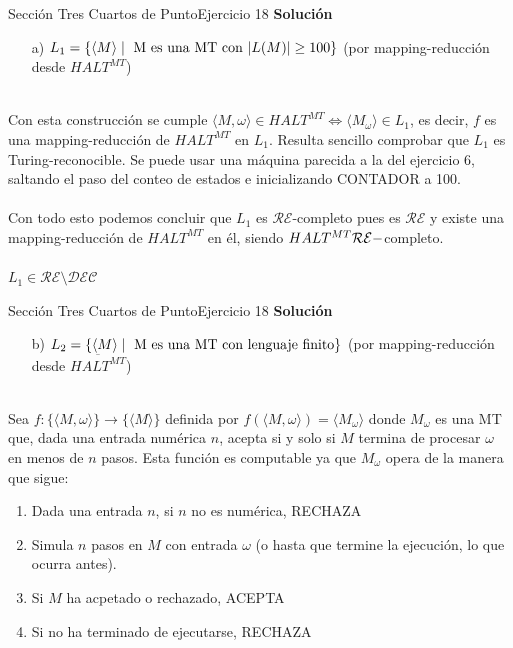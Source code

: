 \documentclass[10pt, envcountsect, presentation, aspectratio=169]{beamer}
\begin{document}

\begin{frame}{Sección Tres Cuartos de Punto}{Ejercicio 18}
    \textbf{Solución}\\
    \begin{itemize}
        \item[a)] $L_1 = \{\langle M \rangle \mid \hbox{ M es una MT con } |L(M)| \geq 100\}$ (por mapping-reducción desde $HALT^{MT}$) \\~\\
    \end{itemize}
    Con esta construcción se cumple $\langle M, \omega \rangle \in HALT^{MT} \Leftrightarrow \langle M_{\omega} \rangle \in L_1$, es decir, $f$ es una mapping-reducción de $HALT^{MT}$ en $L_1$. Resulta sencillo comprobar que $L_1$ es Turing-reconocible.
    Se puede usar una máquina parecida a la del ejercicio 6, saltando el paso del conteo de estados e inicializando CONTADOR a 100.\\~\\
    Con todo esto podemos concluir que $L_1$ es $\mathcal{RE}$-completo pues es $\mathcal{RE}$ y existe una mapping-reducción de $HALT^{MT}$ en él, siendo $HALT^{MT} \space \mathcal{RE}-$completo.\\~\\
    $L_1 \in \mathcal{RE} \setminus \mathcal{DEC}$ 
\end{frame}


\begin{frame}{Sección Tres Cuartos de Punto}{Ejercicio 18}
    \textbf{Solución}\\
    \begin{itemize}
        \item[b)] $L_2=\{\langle M \rangle \mid \hbox{ M es una MT con lenguaje finito}  \}$ (por mapping-reducción desde $\overline{HALT^{MT}}$)\\~\\
    \end{itemize}
    Sea $f: \{\langle M, \omega \rangle\} \rightarrow \{\langle M \rangle \}$ definida por $f(\langle M, \omega \rangle) = \langle M_{\omega} \rangle$ donde $M_{\omega}$ es una MT que, dada una entrada numérica $n$, acepta si y solo si $M$ termina de procesar $\omega$ en menos de $n$ pasos.
    Esta función es computable ya que $M_\omega$ opera de la manera que sigue:
    \begin{enumerate}
        \item Dada una entrada $n$, si $n$ no es numérica, RECHAZA
        \item Simula $n$ pasos en $M$ con entrada $\omega$ (o hasta que termine la ejecución, lo que ocurra antes).
        \item Si $M$ ha acpetado o rechazado, ACEPTA
        \item Si no ha terminado de ejecutarse, RECHAZA
    \end{enumerate}  
\end{frame}
\end{document}
